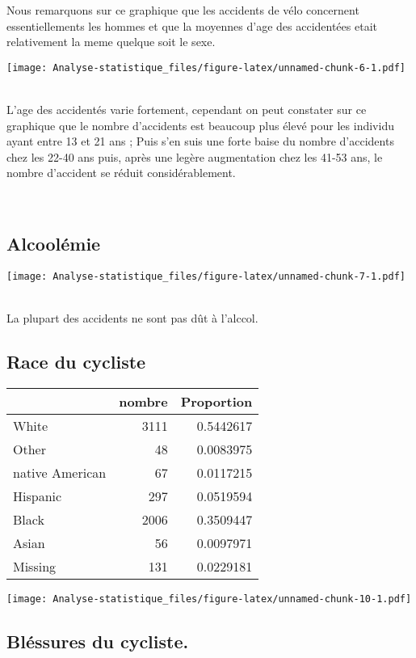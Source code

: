 \documentclass[
  french,
]{article}
\begin{document}
Nous remarquons sur ce graphique que les accidents de vélo concernent
essentiellements les hommes et que la moyennes d'age des accidentées
etait relativement la meme quelque soit le sexe.

\texttt{[image: Analyse-statistique\_files/figure-latex/unnamed-chunk-6-1.pdf]}
~

L'age des accidentés varie fortement, cependant on peut constater sur ce
graphique que le nombre d'accidents est beaucoup plus élevé pour les
individu ayant entre 13 et 21 ans ; Puis s'en suis une forte baise du
nombre d'accidents chez les 22-40 ans puis, après une legère
augmentation chez les 41-53 ans, le nombre d'accident se réduit
considérablement.

~

\hypertarget{alcooluxe9mie}{%
\subsection{Alcoolémie}\label{alcooluxe9mie}}

\texttt{[image: Analyse-statistique\_files/figure-latex/unnamed-chunk-7-1.pdf]}
~

La plupart des accidents ne sont pas dût à l'alccol.

\hypertarget{race-du-cycliste}{%
\subsection{Race du cycliste}\label{race-du-cycliste}}

\begin{table}
\centering
\begin{tabular}{l|r|r}
\hline
  & nombre & Proportion\\
\hline
White & 3111 & 0.5442617\\
\hline
Other & 48 & 0.0083975\\
\hline
native American & 67 & 0.0117215\\
\hline
Hispanic & 297 & 0.0519594\\
\hline
Black & 2006 & 0.3509447\\
\hline
Asian & 56 & 0.0097971\\
\hline
Missing & 131 & 0.0229181\\
\hline
\end{tabular}
\end{table}

\texttt{[image: Analyse-statistique\_files/figure-latex/unnamed-chunk-10-1.pdf]}

\hypertarget{bluxe9ssures-du-cycliste.}{%
\subsection{Bléssures du cycliste.}\label{bluxe9ssures-du-cycliste.}}
\end{document}
